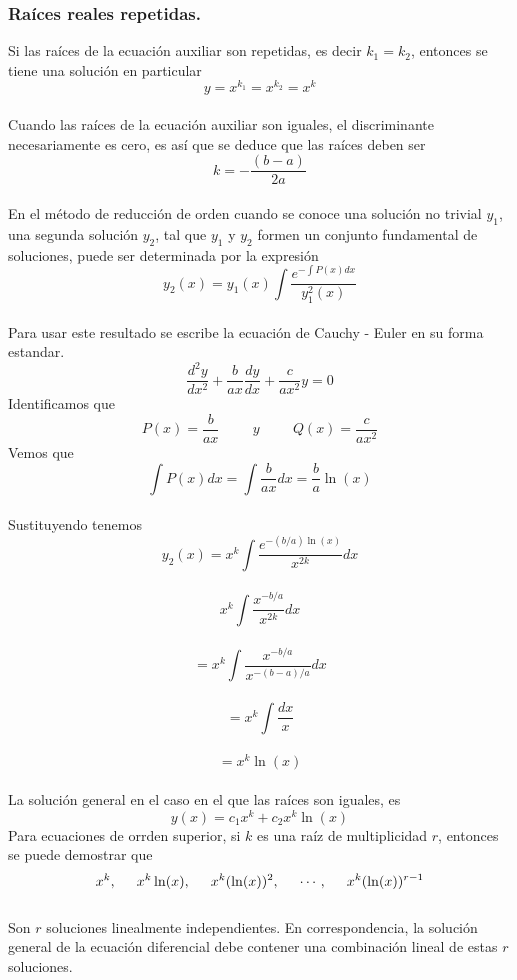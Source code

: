 \documentclass[12pt,letterpaper]{article}
\begin{document}
\subsubsection{\large Raíces reales repetidas.}
Si las raíces de la ecuación auxiliar son repetidas, es decir $k_{1}=k_{2}$, entonces se tiene una solución en particular
$$y=x^{k_{1}}=x^{k_{2}}=x^{k}$$\\
Cuando las raíces de la ecuación auxiliar son iguales, el discriminante necesariamente es cero, es así que se deduce que las raíces deben ser\\
$$k=-\frac{(b-a)}{2a}$$\\
En el método de reducción de orden cuando se conoce una solución no trivial $y_{1}$, una segunda solución $y_{2}$, tal que $y_{1}$ y $y_{2}$ formen un conjunto fundamental de soluciones, puede ser determinada por la expresión\\
$$y_{2}(x)=y_{1}(x)\int\dfrac{e^{-\int{P(x)dx}}}{y^{2}_{1}(x)}$$\\
Para usar este resultado se escribe la ecuación de Cauchy - Euler en su forma estandar.\\
$$\frac{d^{2}y}{dx^{2}}+\frac{b}{ax}\frac{dy}{dx}+\frac{c}{ax^{2}}y=0$$
Identificamos que\\
$$P(x)=\frac{b}{ax}\hspace{1cm} y \hspace{1cm}Q(x)=\frac{c}{ax^{2}}$$
Vemos que\\
$$\int{P(x)dx}=\int{\frac{b}{ax}dx}=\frac{b}{a}\ln(x)$$\\
Sustituyendo tenemos\\
$$y_{2}(x)=x^{k}\int{\frac{e^{-(b/a)\ln(x)}}{x^{2k}}dx}$$\\
$$x^{k}\int{\frac{x^{-b/a}}{x^{2k}}dx}$$\\
$$=x^{k}\int{\frac{x^{-b/a}}{x^{-(b-a)/a}}dx}$$\\
$$=x^{k}\int{\frac{dx}{x}}$$\\
$$=x^{k}\ln(x)$$\\
La solución general en el caso en el que las raíces son iguales, es
$$y(x)=c_{1}x^{k}+c_{2}x^{k}\ln(x)$$
Para ecuaciones de orrden superior, si $k$ es una raíz de multiplicidad $r$, entonces se puede demostrar que\\
$$x^{k},\hspace{0.5cm}x^{k}\ln(x),\hspace{0.5cm}x^{k}(\ln(x))^{2},\hspace{0.5cm}\cdots,\hspace{0.5cm}x^{k}(\ln(x))^{r-1}$$\\
Son $r$ soluciones linealmente independientes. En correspondencia, la solución general de la ecuación diferencial debe contener una combinación lineal de estas $r$ soluciones.\\
\end{document}
